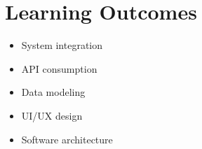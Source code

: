 \section{Learning Outcomes}
\begin{itemize}
  \item System integration
  \item API consumption
  \item Data modeling
  \item UI/UX design
  \item Software architecture
\end{itemize}
